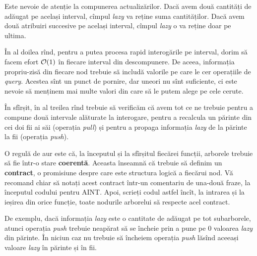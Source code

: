 \documentclass[../main.tex]{subfiles}
\begin{document}
Este nevoie de atenție la compunerea actualizărilor. Dacă avem două cantități de adăugat pe același interval, cîmpul \textit{lazy} va reține suma cantităților. Dacă avem două atribuiri succesive pe același interval, cîmpul \textit{lazy} o va reține doar pe ultima.

În al doilea rînd, pentru a putea procesa rapid interogările pe interval, dorim să facem efort $\mathcal{O}(1)$ în fiecare interval din descompunere. De aceea, informația propriu-zisă din fiecare nod trebuie să includă valorile pe care le cer operațiile de \textit{query}. Acestea sînt un punct de pornire, dar uneori nu sînt suficiente, ci este nevoie să menținem mai multe valori din care să le putem alege pe cele cerute.

În sfîrșit, în al treilea rînd trebuie să verificăm că avem tot ce ne trebuie pentru a compune două intervale alăturate la interogare, pentru a recalcula un părinte din cei doi fii ai săi (operația \textit{pull}) și pentru a propaga informația \textit{lazy} de la părinte la fii (operația \textit{push}).

O regulă de aur este că, la începutul și la sfîrșitul fiecărei funcții, arborele trebuie să fie într-o stare \textbf{coerentă}. Aceasta înseamnă că trebuie să definim un \textbf{contract}, o promisiune despre care este structura logică a fiecărui nod. Vă recomand chiar să notați acest contract într-un comentariu de una-două fraze, la începutul codului pentru AINT. Apoi, scrieți codul astfel încît, la intrarea și la ieșirea din orice funcție, toate nodurile arborelui să respecte acel contract.

De exemplu, dacă informația \textit{lazy} este o cantitate de adăugat pe tot subarborele, atunci operația \textit{push} trebuie neapărat să se încheie prin a pune pe 0 valoarea \textit{lazy} din părinte. În niciun caz nu trebuie să încheiem operația \textit{push} lăsînd aceeași valoare \textit{lazy} în părinte și în fii.
\end{document}
